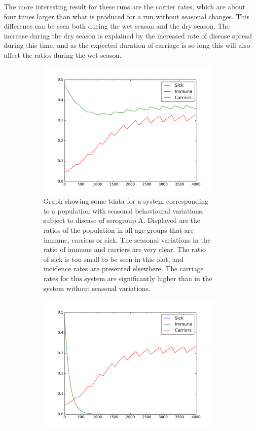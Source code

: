 \documentclass[10pt,a4paper]{article}
\begin{document}
The more interesting result for these runs are the carrier rates, which are about four times larger than what is produced for a run without seasonal changes. This difference can be seen both during the wet season and the dry season. The increase during the dry season is explained by the increased rate of disease spread during this time, and as the expected duration of carriage is so long this will also affect the ratios during the wet season.

\begin{figure}
	\centering
	\begin{subfigure}{0.45\textwidth}
		\includegraphics[width=\textwidth]{figures/plotted_disease_endemic_2pop_A}
		\caption{Graph showing some tdata for a system corresponding to a population with seasonal behavioural variations, subject to disease of serogroup A. Displayed are the ratios of the population in all age groups that are immune, carriers or sick. The seasonal variations in the ratio of immune and carriers are very clear. The ratio of sick is too small to be seen in this plot, and incidence rates are presented elsewhere. The carriage rates for this system are significantly higher than in the system without seasonal variations.} \label{fig:results:seasonal_disease_A}
	\end{subfigure}
	\begin{subfigure}{0.45\textwidth}
		\includegraphics[width=\textwidth]{figures/plotted_disease_endemic_2pop_W135}

\end{subfigure}
\end{figure}
\end{document}
